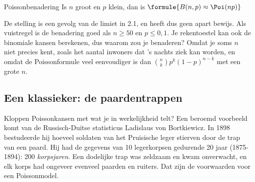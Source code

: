 \begin{theorie}
\begin{stelling}{Poissonbenadering}
Is $n$ groot en $p$ klein, dan is \quad $\formule{B(n, p) \approx \Poi(np)}$
\end{stelling}
\end{theorie}

De stelling is een gevolg van de limiet in 2.1, en heeft dus geen apart bewijs. Als vuistregel is de benadering goed als $n \geqslant 50$ en $p \leqslant 0{,}1$. Je rekentoestel kan ook de binomiale kansen berekenen, dus waarom zou je benaderen? Omdat je soms $n$ niet precies kent, zoals het aantal inwoners dat 's nachts ziek kan worden, en omdat de Poissonformule veel eenvoudiger is dan $\binom{n}{k}p^k(1 - p)^{n - k}$ met een grote $n$.


\begin{oefeningen}
\end{oefeningen}

\subsection{Een klassieker: de paardentrappen}

Kloppen Poissonkansen met wat je in werkelijkheid telt? Een beroemd voorbeeld komt van de Russisch-Duitse statisticus Ladislaus von Bortkiewicz. In 1898 bestudeerde hij hoeveel soldaten van het Pruisische leger stierven door de trap van een paard. Hij had de gegevens van 10 legerkorpsen gedurende 20 jaar (1875-1894): 200 \textit{korpsjaren}. Een dodelijke trap was zeldzaam en kwam onverwacht, en elk korps had ongeveer evenveel paarden en ruiters. Dat zijn de voorwaarden voor een Poissonmodel.

